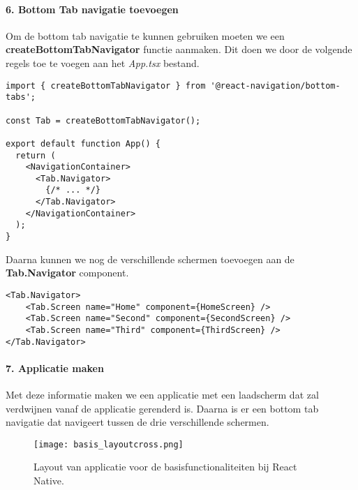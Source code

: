 \paragraph{6. Bottom Tab navigatie toevoegen}
Om de bottom tab navigatie te kunnen gebruiken moeten we een \textbf{createBottomTabNavigator}
functie aanmaken. Dit doen we door de volgende regels toe te voegen aan het \textit{App.tsx} bestand.
\begin{verbatim}
import { createBottomTabNavigator } from '@react-navigation/bottom-tabs';

const Tab = createBottomTabNavigator();

export default function App() {
  return (
    <NavigationContainer>
      <Tab.Navigator>
        {/* ... */}
      </Tab.Navigator>
    </NavigationContainer>
  );
}
\end{verbatim}
Daarna kunnen we nog de verschillende schermen toevoegen aan de \textbf{Tab.Navigator} component.
\begin{verbatim}
<Tab.Navigator>
    <Tab.Screen name="Home" component={HomeScreen} />
    <Tab.Screen name="Second" component={SecondScreen} />
    <Tab.Screen name="Third" component={ThirdScreen} />
</Tab.Navigator>
\end{verbatim}

\paragraph{7. Applicatie maken}
Met deze informatie maken we een applicatie met een laadscherm dat zal verdwijnen vanaf de 
applicatie gerenderd is. Daarna is er een bottom tab navigatie dat navigeert tussen 
de drie verschillende schermen. 
\begin{figure}[H]
    \centering
    \texttt{[image: basis\_layoutcross.png]}
    \caption{Layout van applicatie voor de basisfunctionaliteiten bij React Native.}
\end{figure}